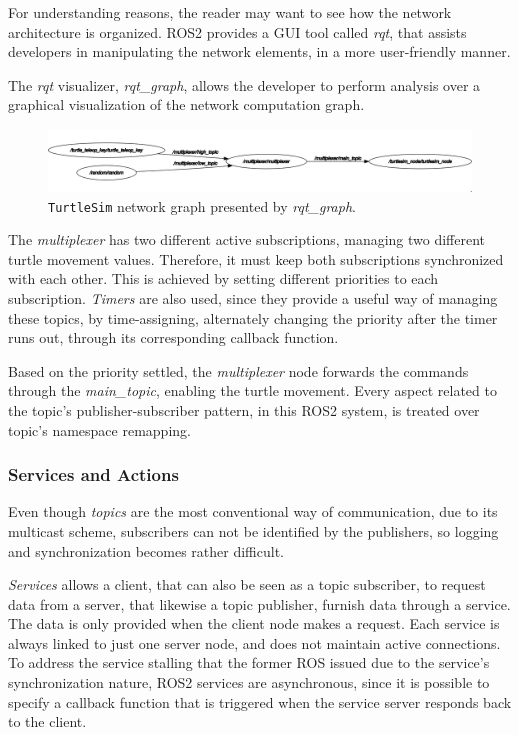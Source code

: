 For understanding reasons, the reader may want to see how the network architecture is organized. ROS2 provides a GUI tool called \textit{rqt}, that assists developers in manipulating the network elements, in a more user-friendly manner. 

The \textit{rqt} visualizer, \textit{rqt\_graph}, allows the developer to perform analysis over a graphical visualization of the network computation graph.

\begin{figure}[H]
        \centering
        \includegraphics[width=0.8\linewidth]{images/ts_rqt_graph.png}
        \caption{\texttt{TurtleSim} network graph presented by \textit{rqt\_graph}.}
        \label{fig:ts-rqt-graph}
\end{figure}


The \textit{multiplexer} has two different active subscriptions, managing two different turtle movement values. Therefore, it must keep both subscriptions synchronized with each other. This is achieved by setting different priorities to each subscription. %
\textit{Timers} are also used, since they provide a useful way of managing these topics, by time-assigning, alternately changing the priority after the timer runs out, through its corresponding callback function.

Based on the priority settled, the \textit{multiplexer} node forwards the commands through the \textit{main\_topic}, enabling the turtle movement. Every aspect related to the topic's publisher-subscriber pattern, in this ROS2 system, is treated over topic's namespace remapping.

\subsubsection{Services and Actions}

Even though \textit{topics} are the most conventional way of communication, due to its multicast scheme, subscribers can not be identified by the publishers, so logging and synchronization becomes rather difficult.

\textit{Services} allows a client, that can also be seen as a topic subscriber, to request data from a server, that likewise a topic publisher, furnish data through a service. The data is only provided when the client node makes a request. Each service is always linked to just one server node, and does not maintain active connections. To address the service stalling that the former ROS issued due to the service's synchronization nature, ROS2 services are asynchronous, since it is possible to specify a callback function that is triggered when the service server responds back to the client.

